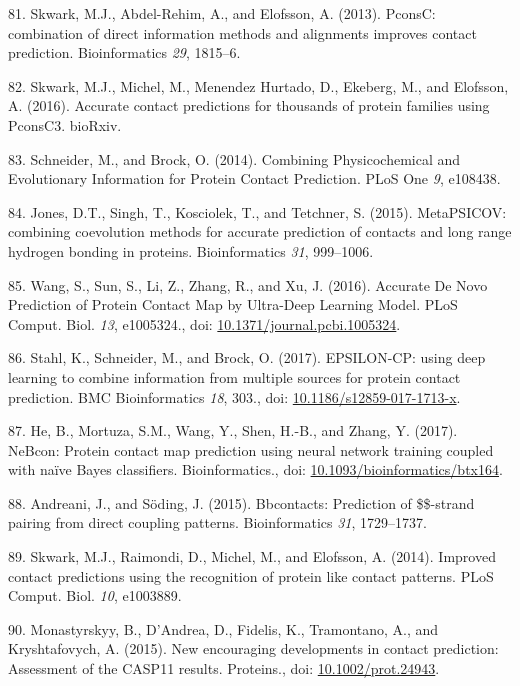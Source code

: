 \documentclass[11pt,a4paper,twoside]{book}
\theoremstyle{definition}
\theoremstyle{definition}
\theoremstyle{remark}
\begin{document}
\hypertarget{ref-Skwark2013}{}
81. Skwark, M.J., Abdel-Rehim, A., and Elofsson, A. (2013). PconsC:
combination of direct information methods and alignments improves
contact prediction. Bioinformatics \emph{29}, 1815--6.

\hypertarget{ref-Skwark2016}{}
82. Skwark, M.J., Michel, M., Menendez Hurtado, D., Ekeberg, M., and
Elofsson, A. (2016). Accurate contact predictions for thousands of
protein families using PconsC3. bioRxiv.

\hypertarget{ref-Schneider2014}{}
83. Schneider, M., and Brock, O. (2014). Combining Physicochemical and
Evolutionary Information for Protein Contact Prediction. PLoS One
\emph{9}, e108438.

\hypertarget{ref-Jones2015a}{}
84. Jones, D.T., Singh, T., Kosciolek, T., and Tetchner, S. (2015).
MetaPSICOV: combining coevolution methods for accurate prediction of
contacts and long range hydrogen bonding in proteins. Bioinformatics
\emph{31}, 999--1006.

\hypertarget{ref-Wang2016a}{}
85. Wang, S., Sun, S., Li, Z., Zhang, R., and Xu, J. (2016). Accurate De
Novo Prediction of Protein Contact Map by Ultra-Deep Learning Model.
PLoS Comput. Biol. \emph{13}, e1005324., doi:
\href{https://doi.org/10.1371/journal.pcbi.1005324}{10.1371/journal.pcbi.1005324}.

\hypertarget{ref-Stahl2017}{}
86. Stahl, K., Schneider, M., and Brock, O. (2017). EPSILON-CP: using
deep learning to combine information from multiple sources for protein
contact prediction. BMC Bioinformatics \emph{18}, 303., doi:
\href{https://doi.org/10.1186/s12859-017-1713-x}{10.1186/s12859-017-1713-x}.

\hypertarget{ref-He2017}{}
87. He, B., Mortuza, S.M., Wang, Y., Shen, H.-B., and Zhang, Y. (2017).
NeBcon: Protein contact map prediction using neural network training
coupled with naïve Bayes classifiers. Bioinformatics., doi:
\href{https://doi.org/10.1093/bioinformatics/btx164}{10.1093/bioinformatics/btx164}.

\hypertarget{ref-Andreani2015a}{}
88. Andreani, J., and Söding, J. (2015). Bbcontacts: Prediction of
\$\$-strand pairing from direct coupling patterns. Bioinformatics
\emph{31}, 1729--1737.

\hypertarget{ref-Skwark2014a}{}
89. Skwark, M.J., Raimondi, D., Michel, M., and Elofsson, A. (2014).
Improved contact predictions using the recognition of protein like
contact patterns. PLoS Comput. Biol. \emph{10}, e1003889.

\hypertarget{ref-Monastyrskyy2015}{}
90. Monastyrskyy, B., D'Andrea, D., Fidelis, K., Tramontano, A., and
Kryshtafovych, A. (2015). New encouraging developments in contact
prediction: Assessment of the CASP11 results. Proteins., doi:
\href{https://doi.org/10.1002/prot.24943}{10.1002/prot.24943}.
\end{document}
